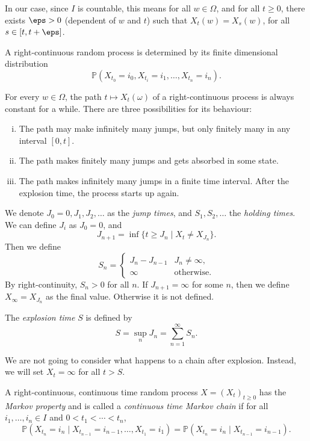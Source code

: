 \documentclass[12pt]{article}
\begin{document}
In our case, since $I$ is countable, this means for all $w \in \Omega$, and for all $t \geq 0$, there exists $\eps > 0$ (dependent of $w$ and $t$) such that $X_t(w) = X_{s}(w)$, for all $s \in [t, t+\eps]$.

\begin{proposition}
	A right-continuous random process is determined by its finite dimensional distribution
	\[
	\mathbb{P}(X_{t_0} = i_0, X_{t_i} = i_1, \ldots, X_{t_n} = i_n)
	.\]
\end{proposition}

For every $w \in \Omega$, the path $t \mapsto X_t(\omega)$ of a right-continuous process is always constant for a while. There are three possibilities for its behaviour:
\begin{enumerate}[(i)]
	\item The path may make infinitely many jumps, but only finitely many in any interval $[0, t]$.
	\item The path makes finitely many jumps and gets absorbed in some state.
	\item The path makes infinitely many jumps in a finite time interval. After the explosion time, the process starts up again.
\end{enumerate}

We denote $J_0 = 0, J_1, J_2, \ldots$ as the \emph{jump times}, and $S_1, S_2, \ldots$ the \emph{holding times}. We can define $J_{i}$ as $J_0 = 0$, and
\[
	J_{n+1} = \inf\{t \geq J_n \mid X_{t} \neq X_{J_n}\}
.\]
Then we define
\[
S_n =
\begin{cases}
	J_n - J_{n-1} & J_n \neq \infty, \\
	\infty & \text{otherwise}.
\end{cases}
\]
By right-continuity, $S_n > 0$ for all $n$. If $J_{n+1} = \infty$ for some $n$, then we define $X_{\infty} = X_{J_n}$ as the final value. Otherwise it is not defined.

The \emph{explosion time} $S$ is defined by
\[
S = \sup_{n}J_n = \sum_{n = 1}^{\infty}S_n
.\]

We are not going to consider what happens to a chain after explosion. Instead, we will set $X_t = \infty$ for all $t > S$.

\begin{definition}
	A right-continuous, continuous time random process $X = (X_t)_{t \geq 0}$ has the \emph{Markov property} and is called a \emph{continuous time Markov chain} if for all $i_1, \ldots, i_n \in I$ and $0 < t_1 < \cdots < t_n$,
	\[
	\mathbb{P}(X_{t_n} = i_n \mid X_{t_{n-1}} = i_{n-1}, \ldots, X_{t_1} = i_1) = \mathbb{P}(X_{t_n} = i_n \mid X_{t_{n-1}} = i_{n-1})
	.\]
\end{definition}
\end{document}
